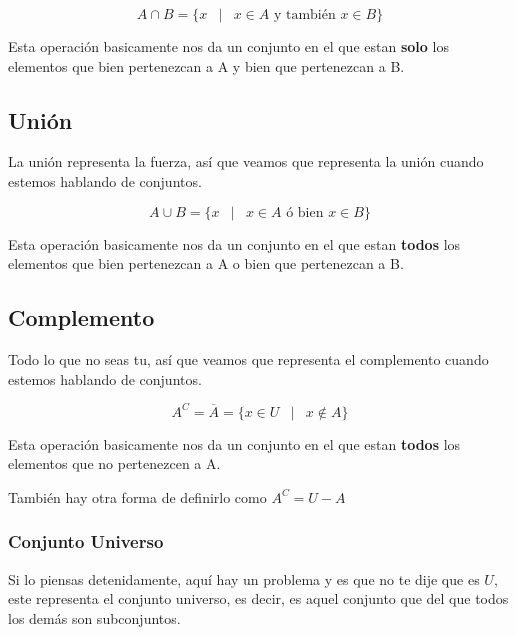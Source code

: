 \documentclass[12pt]{report}                                    %
\DeclareMathOperator \Space {\quad}                             %
\DeclareMathOperator \MiniSpace {\;}                            %
\newcommand \Such {\MiniSpace|\MiniSpace}                       %
\begin{document}
            \begin{equation}
                A \cap B = \{ x \Such x \in A \text{ y también } x \in B \}
            \end{equation}

            Esta operación basicamente nos da un conjunto en el que estan \textbf{solo} los elementos
            que bien pertenezcan a A y bien que pertenezcan a B.


        \clearpage
        \subsection{Unión}

            La unión representa la fuerza, así que veamos que representa la unión cuando estemos
            hablando de conjuntos.

            \begin{equation}
                A \cup B = \{ x \Such x \in A \text{ ó bien } x \in B \}
            \end{equation}

            Esta operación basicamente nos da un conjunto en el que estan \textbf{todos} los elementos
            que bien pertenezcan a A o bien que pertenezcan a B.


        \clearpage
        \subsection{Complemento}

            Todo lo que no seas tu, así que veamos que representa el complemento cuando estemos
            hablando de conjuntos.

            \begin{equation}
                A^C = \overline A = \{ x \in U \Such x \notin A \}
            \end{equation}

            Esta operación basicamente nos da un conjunto en el que estan \textbf{todos} los elementos
            que no pertenezcen a A.

            También hay otra forma de definirlo como $A^C = U - A$

            \subsubsection{Conjunto Universo}
                Si lo piensas detenidamente, aquí hay un problema y es que no te dije que es $U$, este
                representa el conjunto universo, es decir, es aquel conjunto que del que todos los demás
                son subconjuntos.
\end{document}
